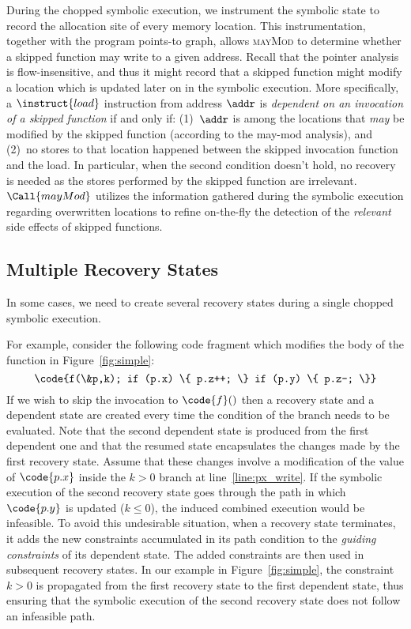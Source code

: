 During the chopped symbolic execution, we instrument the symbolic
state to record the allocation site of every memory location. This
instrumentation, together with the program points-to graph, allows
\textsc{mayMod} to determine whether a skipped function may write to a
given address. Recall that the pointer analysis is flow-insensitive,
and thus it might record that a skipped function might modify a
location which is updated later on in the symbolic execution.  More
specifically, a $\instruct{load}$ instruction from address $\addr$ is
\emph{dependent on an invocation of a skipped function} if and only
if: (1)~$\addr$ is among the locations that \textit{may} be modified
by the skipped function (according to the may-mod analysis), and
(2)~no stores to that location happened between the skipped invocation
function and the load. In particular, when the second condition
doesn't hold, no recovery is needed as the stores performed by the
skipped function are irrelevant. $\Call{mayMod}$ utilizes the
information gathered during the symbolic execution regarding
overwritten locations to refine on-the-fly the detection of the
\emph{relevant} side effects of skipped functions.

\subsection{Multiple Recovery States}
\label{Se:MultiRecovery}
In some cases, we need to create several recovery states during a
single chopped symbolic execution.

For example, consider the following code fragment which modifies the
body of the  function in Figure~\ref{fig:simple}:
\[
\code{f(\&p,k); if (p.x) \{ p.z++; \} if (p.y) \{ p.z--; \}}
\]
If we wish to skip the invocation to $\code{f}()$ then a recovery
state and a dependent state are created every time the condition of
the branch needs to be evaluated. Note that the second dependent state
is produced from the first dependent one and that the resumed state
encapsulates the changes made by the first recovery state. Assume that
these changes involve a modification of the value of $\code{p.x}$
inside the $k>0$ branch at line~\ref{line:px_write}. If the symbolic
execution of the second recovery state goes through the path in which
$\code{p.y}$ is updated ($k\le0$), the induced combined execution
would be infeasible. To avoid this undesirable situation, when a
recovery state terminates, it adds the new constraints accumulated in
its path condition to the \textit{guiding constraints} of its dependent state. The added
constraints are then used in subsequent recovery states. In our
example in Figure~\ref{fig:simple}, the constraint $k > 0$ is
propagated from the first recovery state to the first dependent state,
thus ensuring that the symbolic execution of the second recovery state
does not follow an infeasible path.







